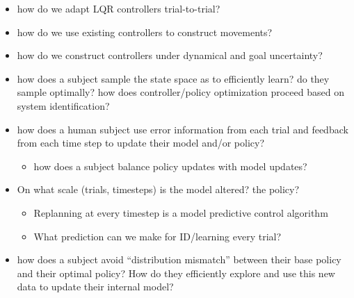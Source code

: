 \documentclass[
  a4paper,
]{article}
\providecommand{\tightlist}{%
  \setlength{\itemsep}{0pt}\setlength{\parskip}{0pt}}
\begin{document}
\begin{itemize}
\item
  how do we adapt LQR controllers trial-to-trial?
\item
  how do we use existing controllers to construct movements?
\item
  how do we construct controllers under dynamical and goal uncertainty?
\item
  how does a subject sample the state space as to efficiently learn? do
  they sample optimally? how does controller/policy optimization proceed
  based on system identification?
\item
  how does a human subject use error information from each trial and
  feedback from each time step to update their model and/or policy?

  \begin{itemize}
  \tightlist
  \item
    how does a subject balance policy updates with model updates?
  \end{itemize}
\item
  On what scale (trials, timesteps) is the model altered? the policy?

  \begin{itemize}
  \tightlist
  \item
    Replanning at every timestep is a model predictive control algorithm
  \item
    What prediction can we make for ID/learning every trial?
  \end{itemize}
\item
  how does a subject avoid ``distribution mismatch'' between their base
  policy and their optimal policy? How do they efficiently explore and
  use this new data to update their internal model?


\end{itemize}
\end{document}

